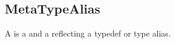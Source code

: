 \subsection{MetaTypeAlias}
\label{concept-MetaTypeAlias}

A  is a  and a 
reflecting a typedef or type alias.


